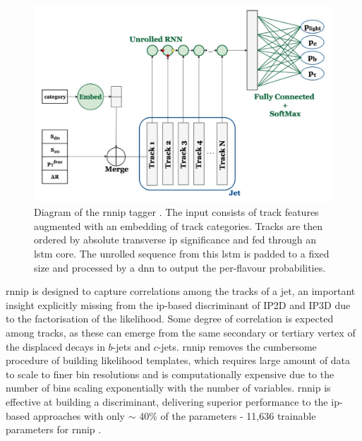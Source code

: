 \begin{figure}[h!]
  \center
  \includegraphics[scale=0.6]{Images/FTAG/rnnip_structure.png}
  \caption{Diagram of the \gls{rnnip} tagger \cite{Paganini:2289214}. The input consists of track features augmented with an embedding of track categories. Tracks are then ordered by absolute transverse \gls{ip} significance and fed through an \gls{lstm} core. The unrolled sequence from this \gls{lstm} is padded to a fixed size and processed by a \gls{dnn} to output the per-flavour probabilities.} 
  \label{fig:rnnipModel}
\end{figure}

\gls{rnnip} is designed to capture correlations among the tracks of a jet, an important insight explicitly missing from the \gls{ip}-based discriminant of IP2D and IP3D due to the factorisation of the likelihood. Some degree of correlation is expected among tracks, as these can emerge from the same secondary or tertiary vertex of the displaced decays in $b$-jets and $c$-jets. \gls{rnnip} removes the cumbersome procedure of building likelihood templates, which requires large amount of data to scale to finer bin resolutions and is computationally expensive due to the number of bins scaling exponentially with the number of variables. \gls{rnnip} is effective at building a discriminant, delivering superior performance to the \gls{ip}-based approaches with only $\sim$ 40\% of the parameters - 11,636 trainable parameters for \gls{rnnip} \cite{Paganini:2289214}.

